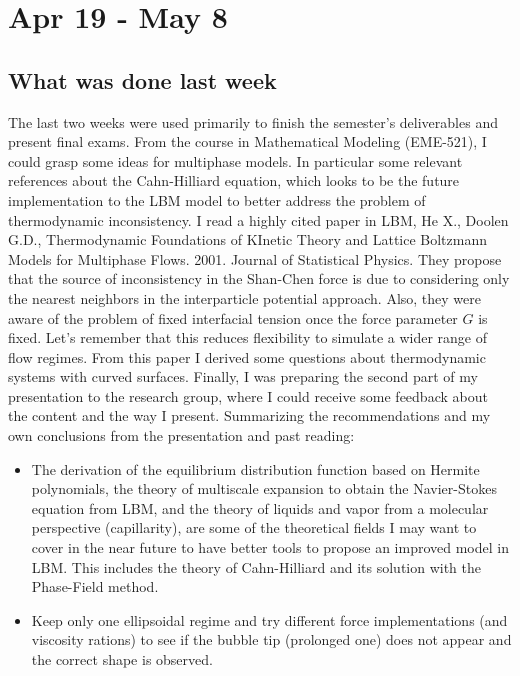 \documentclass[12pt]{article}
\begin{document}
	\pagebreak
	\section*{Apr 19 - May 8}
	\subsection*{What was done last week}
	The last two weeks were used primarily to finish the semester's deliverables and present final exams. From the course in Mathematical Modeling (EME-521), I could grasp some ideas for multiphase models. In particular some relevant references about the Cahn-Hilliard equation, which looks to be the future implementation to the LBM model to better address the problem of thermodynamic inconsistency. I read a highly cited paper in LBM, He X., Doolen G.D., Thermodynamic Foundations of KInetic Theory and Lattice Boltzmann Models for Multiphase Flows. 2001. Journal of Statistical Physics. They propose that the source of inconsistency in the Shan-Chen force is due to considering only the nearest neighbors in the interparticle potential approach. Also, they were aware of the problem of fixed interfacial tension once the force parameter $G$ is fixed. Let's remember that this reduces flexibility to simulate a wider range of flow regimes. From this paper I derived some questions about thermodynamic systems with curved surfaces. Finally, I was preparing the second part of my presentation to the research group, where I could receive some feedback about the content and the way I present. Summarizing the recommendations and my own conclusions from the presentation and past reading:
	
	\begin{itemize}[leftmargin=*]
		\item The derivation of the equilibrium distribution function based on Hermite polynomials, the theory of multiscale expansion to obtain the Navier-Stokes equation from LBM, and the theory of liquids and vapor from a molecular perspective (capillarity), are some of the theoretical fields I may want to cover in the near future to have better tools to propose an improved model in LBM. This includes the theory of Cahn-Hilliard and its solution with the Phase-Field method. 
		
		\item Keep only one ellipsoidal regime and try different force implementations (and viscosity rations) to see if the bubble tip (prolonged one) does not appear and the correct shape is observed. 
	\end{itemize}
\end{document}
